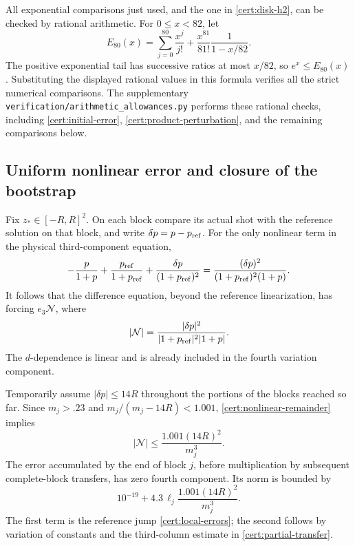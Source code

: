 All exponential comparisons just used, and the one in
\eqref{cert:disk-h2}, can be checked by rational arithmetic.
For \(0\le x<82\), let
\[
 E_{80}(x)=\sum_{j=0}^{80}\frac{x^j}{j!}
 +\frac{x^{81}}{81!}\frac1{1-x/82}.
\]
The positive exponential tail has successive ratios at most \(x/82\),
so \(e^x\le E_{80}(x)\).
Substituting the displayed rational values in this formula verifies all
the strict numerical comparisons.  The supplementary
\texttt{verification/arithmetic\_allowances.py} performs these rational
checks, including \eqref{cert:initial-error},
\eqref{cert:product-perturbation}, and the remaining comparisons below.

\subsection{Uniform nonlinear error and closure of the bootstrap}
\label{cert:nonlinear}

Fix \(z_*\in[-R,R]^2\).  On each block compare its actual shot with the
reference solution on that block, and write \(\delta p=p-p_{\rm ref}\).
For the only nonlinear term in the physical third-component equation,
\[
 -\frac{p}{1+p}
 +\frac{p_{\rm ref}}{1+p_{\rm ref}}
 +\frac{\delta p}{(1+p_{\rm ref})^2}
 =\frac{(\delta p)^2}{(1+p_{\rm ref})^2(1+p)}.
\]
It follows that the difference equation, beyond the reference
linearization, has forcing \(e_3\mathcal N\), where
\begin{equation}\label{cert:nonlinear-remainder}
 |\mathcal N|=
 \frac{|\delta p|^2}{|1+p_{\rm ref}|^2|1+p|}.
\end{equation}
The \(d\)-dependence is linear and is already included in the fourth
variation component.

Temporarily assume \(|\delta p|\le14R\) throughout the portions of the
blocks reached so far.  Since \(m_j>.23\) and
\(m_j/(m_j-14R)<1.001\), \eqref{cert:nonlinear-remainder} implies
\[
 |\mathcal N|\le\frac{1.001(14R)^2}{m_j^3}.
\]
The error accumulated by the end of block \(j\), before multiplication
by subsequent complete-block transfers, has zero fourth component.
Its norm is bounded by
\[
 10^{-19}
  +4.3\,\ell_j\frac{1.001(14R)^2}{m_j^3}.
\]
The first term is the reference jump
\eqref{cert:local-errors}; the second follows by variation of constants
and the third-column estimate in \eqref{cert:partial-transfer}.

